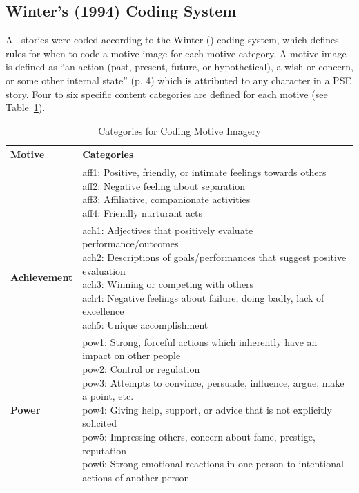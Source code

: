 \documentclass[man,a4paper,mask]{apa6}\usepackage[]{graphicx}\usepackage[]{color}
\begin{document}
\subsection{Winter's (1994) Coding System}
All stories were coded according to the Winter (\citeyear{winter_ManualScoringMotive_1994}) coding system, which defines rules for when to code a motive image for each motive category. A motive image is defined as ``an action (past, present, future, or hypothetical), a wish or concern, or some other internal state'' (p. 4) which is attributed to any character in a PSE story. Four to six specific content categories are defined for each motive (see Table~\ref{tab:wintercategories}). 


\begin{table}
	\caption{Categories for Coding Motive Imagery \parencite{winter_MeasuringPersonalityDistance_1991,winter_ManualScoringMotive_1994}}
	\label{tab:wintercategories}
	\footnotesize
	\centering
	\begin{tabularx}{\textwidth}{lX}
		\toprule
        Motive & Categories \\
			\midrule
		  \adjustbox{valign=t}{\textbf{Affiliation/Intimacy}} & \makecell[l]{aff1: Positive, friendly, or intimate feelings towards others \\aff2: Negative feeling about separation \\aff3: Affiliative, companionate activities \\aff4: Friendly nurturant acts} \\

			\midrule
      \textbf{Achievement} & \makecell[l]{ach1: Adjectives that positively evaluate performance/outcomes \\ach2: Descriptions of goals/performances that suggest positive evaluation \\ach3: Winning or competing with others \\ach4: Negative feelings about failure, doing badly, lack of excellence \\ach5: Unique accomplishment} \\

			\midrule
      \textbf{Power} & \makecell[l]{pow1: Strong, forceful actions which inherently have an impact on other people \\pow2: Control or regulation \\pow3: Attempts to convince, persuade, influence, argue, make a point, etc. \\pow4: Giving help, support, or advice that is not explicitly solicited \\pow5: Impressing others, concern about fame, prestige, reputation \\pow6: Strong emotional reactions in one person to intentional actions of another person} \\
		\bottomrule
	\end{tabularx}
\end{table}
\end{document}

